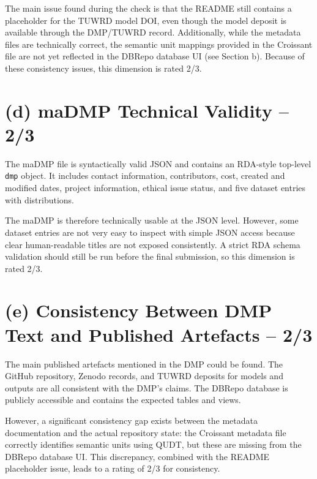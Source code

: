 \documentclass[11pt,a4paper]{article}
\begin{document}
The main issue found during the check is that the README still contains a placeholder for the TUWRD model DOI, even though the model deposit is available through the DMP/TUWRD record. Additionally, while the metadata files are technically correct, the semantic unit mappings provided in the Croissant file are not yet reflected in the DBRepo database UI (see Section b). Because of these consistency issues, this dimension is rated 2/3.

\section*{(d) maDMP Technical Validity -- 2/3}

The maDMP file is syntactically valid JSON and contains an RDA-style top-level \texttt{dmp} object. It includes contact information, contributors, cost, created and modified dates, project information, ethical issue status, and five dataset entries with distributions.

The maDMP is therefore technically usable at the JSON level. However, some dataset entries are not very easy to inspect with simple JSON access because clear human-readable titles are not exposed consistently. A strict RDA schema validation should still be run before the final submission, so this dimension is rated 2/3.

\section*{(e) Consistency Between DMP Text and Published Artefacts -- 2/3}

The main published artefacts mentioned in the DMP could be found. The GitHub repository, Zenodo records, and TUWRD deposits for models and outputs are all consistent with the DMP's claims. The DBRepo database is publicly accessible and contains the expected tables and views.

However, a significant consistency gap exists between the metadata documentation and the actual repository state: the Croissant metadata file correctly identifies semantic units using QUDT, but these are missing from the DBRepo database UI. This discrepancy, combined with the README placeholder issue, leads to a rating of 2/3 for consistency.
\end{document}
